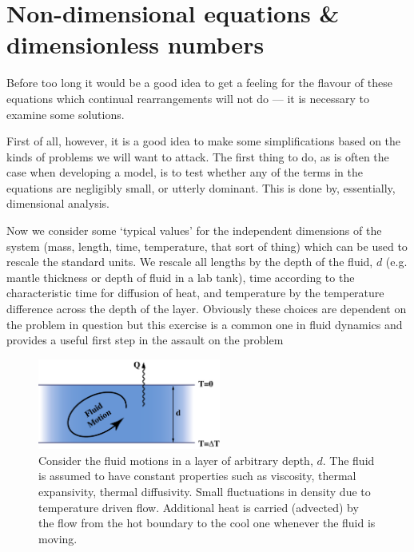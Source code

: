 \documentclass[10pt]{article}
\begin{document}
	\section{Non-dimensional equations \& dimensionless numbers}
	

	
	Before too long it would be a good idea to get a feeling for the 
	flavour of these equations which continual rearrangements will not
	do — it is necessary to examine some solutions. 
	
	First of all, however, it is a good idea to make some simplifications
	based on the kinds of problems we will want to attack. The first
	thing to do, as is often the case when developing a model, is to
	test whether any of the terms in the equations are negligibly
	small, or utterly dominant.  This is done by, essentially, dimensional
	analysis.
	
	Now we consider some `typical values' for the independent
	dimensions of the system (mass, length, time, temperature, that sort of thing) which
	can be used to rescale the standard units.  We rescale all lengths
	by the depth of the fluid, $d$ (e.g. mantle thickness or depth of 
	fluid in a lab tank),  time according to the characteristic time for 
	diffusion of heat, and temperature by the temperature difference 
	across the depth of the layer. Obviously these choices are 
	dependent on the problem in question but this exercise is
	a common one in fluid dynamics and provides a useful first
	step in the assault on the problem
	
		\begin{figure}[h]
			\begin{center}
				\includegraphics[width=60mm]{Diagrams/layer}				
				\caption[]{Consider the fluid motions in a layer of arbitrary depth, $d$. The fluid
				is assumed to have constant properties such as viscosity, thermal expansivity,
				thermal diffusivity. Small fluctuations in density due to temperature driven flow.
				Additional heat is carried (advected) by the flow from the hot boundary to the
				cool one whenever the fluid is moving.}
			\end{center}	
		\end{figure}
	
\end{document}
